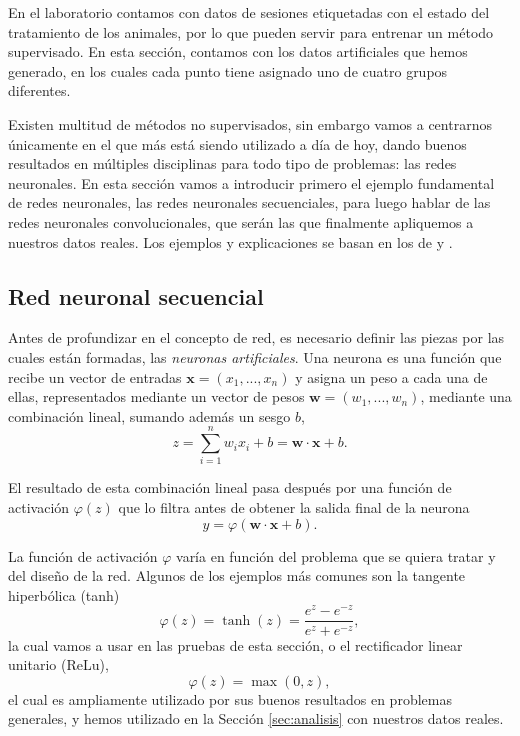 En el laboratorio contamos con datos de sesiones etiquetadas con el estado del tratamiento de los animales, por lo que pueden servir para entrenar un método supervisado. En esta sección, contamos con los datos artificiales que hemos generado, en los cuales cada punto tiene asignado uno de cuatro grupos diferentes.

Existen multitud de métodos no supervisados, sin embargo vamos a centrarnos únicamente en el que más está siendo utilizado a día de hoy, dando buenos resultados en múltiples disciplinas para todo tipo de problemas: las redes neuronales. En esta sección vamos a introducir primero el ejemplo fundamental de redes neuronales, las redes neuronales secuenciales, para luego hablar de las redes neuronales convolucionales, que serán las que finalmente apliquemos a nuestros datos reales. Los ejemplos y explicaciones se basan en los de \cite{understanding} y \cite{pytorch}.

\subsection{Red neuronal secuencial}

Antes de profundizar en el concepto de red, es necesario definir las piezas por las cuales están formadas, las \textit{neuronas artificiales}. Una neurona es una función que recibe un vector de entradas $ \mathbf{x} = (x_1, ..., x_n) $ y asigna un peso a cada una de ellas, representados mediante un vector de pesos $ \mathbf{w} = (w_1, ..., w_n) $, mediante una combinación lineal, sumando además un sesgo $ b $,
\begin{equation}
  z = \sum_{i=1}^n w_i x_i + b = \mathbf{w} \cdot \mathbf{x} + b.
\end{equation}

El resultado de esta combinación lineal pasa después por una función de activación $ \varphi(z) $ que lo filtra antes de obtener la salida final de la neurona
\begin{equation}
  y = \varphi(\mathbf{w} \cdot \mathbf{x} + b).
\end{equation}

La función de activación $ \varphi $ varía en función del problema que se quiera tratar y del diseño de la red. Algunos de los ejemplos más comunes son la tangente hiperbólica (tanh)
\begin{equation}
  \varphi(z) = \operatorname{tanh}(z) = \frac{e^z - e^{-z}}{e^z + e^{-z}},
\end{equation}
la cual vamos a usar en las pruebas de esta sección, o el rectificador linear unitario (ReLu),
\begin{equation}
  \varphi(z) = \operatorname{max}(0, z),
\end{equation}
el cual es ampliamente utilizado por sus buenos resultados en problemas generales, y hemos utilizado en la Sección \ref{sec:analisis} con nuestros datos reales.

